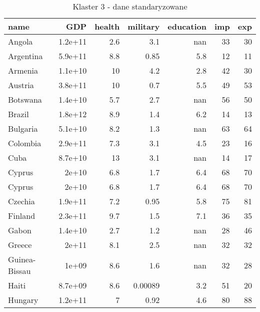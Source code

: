 \begin{table}
    \centering
    \caption{Klaster 3 - dane standaryzowane}
    \label{tab:cl3std}
    \begin{tabular}{lrrrrrr}
        \toprule
        name          & GDP     & health & military & education & imp     & exp     \\
        \midrule
        Angola        & 1.2e+11 & 2.6    & 3.1      & nan       & 33      & 30      \\
        Argentina     & 5.9e+11 & 8.8    & 0.85     & 5.8       & 12      & 11      \\
        Armenia       & 1.1e+10 & 10     & 4.2      & 2.8       & 42      & 30      \\
        Austria       & 3.8e+11 & 10     & 0.7      & 5.5       & 49      & 53      \\
        Botswana      & 1.4e+10 & 5.7    & 2.7      & nan       & 56      & 50      \\
        Brazil        & 1.8e+12 & 8.9    & 1.4      & 6.2       & 14      & 13      \\
        Bulgaria      & 5.1e+10 & 8.2    & 1.3      & nan       & 63      & 64      \\
        Colombia      & 2.9e+11 & 7.3    & 3.1      & 4.5       & 23      & 16      \\
        Cuba          & 8.7e+10 & 13     & 3.1      & nan       & 14      & 17      \\
        Cyprus        & 2e+10   & 6.8    & 1.7      & 6.4       & 68      & 70      \\
        Cyprus        & 2e+10   & 6.8    & 1.7      & 6.4       & 68      & 70      \\
        Czechia       & 1.9e+11 & 7.2    & 0.95     & 5.8       & 75      & 81      \\
        Finland       & 2.3e+11 & 9.7    & 1.5      & 7.1       & 36      & 35      \\
        Gabon         & 1.4e+10 & 2.7    & 1.2      & nan       & 28      & 46      \\
        Greece        & 2e+11   & 8.1    & 2.5      & nan       & 32      & 32      \\
        Guinea-Bissau & 1e+09   & 8.6    & 1.6      & nan       & 32      & 28      \\
        Haiti         & 8.7e+09 & 8.6    & 0.00089  & 3.2       & 51      & 20      \\
        Hungary       & 1.2e+11 & 7      & 0.92     & 4.6       & 80      & 88      \\

\end{tabular}
\end{table}
